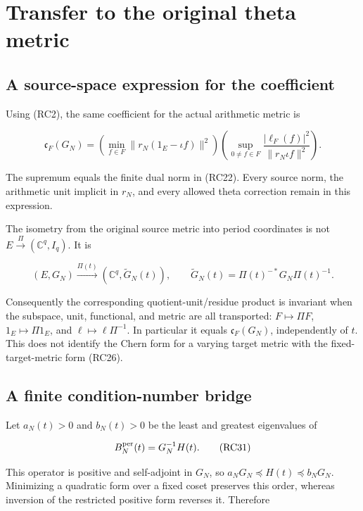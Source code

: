 \documentclass[
  11pt,
]{article}
\begin{document}
\section{Transfer to the original theta
metric}\label{transfer-to-the-original-theta-metric}

\subsection{A source-space expression for the
coefficient}\label{a-source-space-expression-for-the-coefficient}

Using (RC2), the same coefficient for the actual arithmetic metric is

\[
\boxed{\mathfrak c_F(G_N)=
\left(\min_{f\in F}\|r_N(1_E-\iota f)\|^2\right)
\left(\sup_{0\ne f\in F}
\frac{|\ell_F(f)|^2}{\|r_N\iota f\|^2}\right).}
\tag{RC29}
\]

The supremum equals the finite dual norm in (RC22). Every source norm,
the arithmetic unit implicit in \(r_N\), and every allowed theta
correction remain in this expression.

The isometry from the original source metric into period coordinates is
not \(E\xrightarrow{\Pi}(\mathbb C^q,I_q)\). It is

\[
(E,G_N)\xrightarrow{\Pi(t)}
(\mathbb C^q,\widetilde G_N(t)),
\qquad \widetilde G_N(t)=\Pi(t)^{-*}G_N\Pi(t)^{-1}.
\tag{RC30}
\]

Consequently the corresponding quotient-unit/residue product is
invariant when the subspace, unit, functional, and metric are all
transported: \(F\mapsto\Pi F\), \(1_E\mapsto\Pi1_E\), and
\(\ell\mapsto\ell\Pi^{-1}\). In particular it equals
\(\mathfrak c_F(G_N)\), independently of \(t\). This does not identify
the Chern form for a varying target metric with the fixed-target-metric
form (RC26).

\subsection{A finite condition-number
bridge}\label{a-finite-condition-number-bridge}

Let \(a_N(t)>0\) and \(b_N(t)>0\) be the least and greatest eigenvalues
of

\[
B_N^{\rm per}(t)=G_N^{-1}H(t).
\tag{RC31}
\]

This operator is positive and self-adjoint in \(G_N\), so
\(a_NG_N\preceq H(t)\preceq b_NG_N\). Minimizing a quadratic form over a
fixed coset preserves this order, whereas inversion of the restricted
positive form reverses it. Therefore
\end{document}
